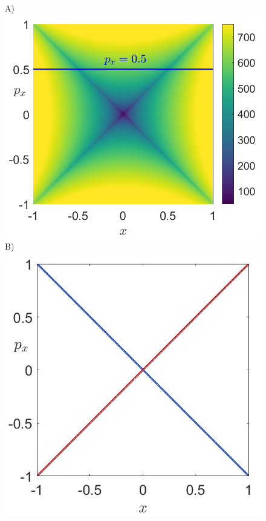 \documentclass[8pt]{article}
\begin{document}
\begin{figure}[htbp]
	\begin{center}
		A)\includegraphics[scale=0.24]{LD_p_05_Saddle_tau_10.png}
		B)\includegraphics[scale=0.24]{manifolds_Saddle_tau_10.png}

\end{center}
\end{figure}
\end{document}
